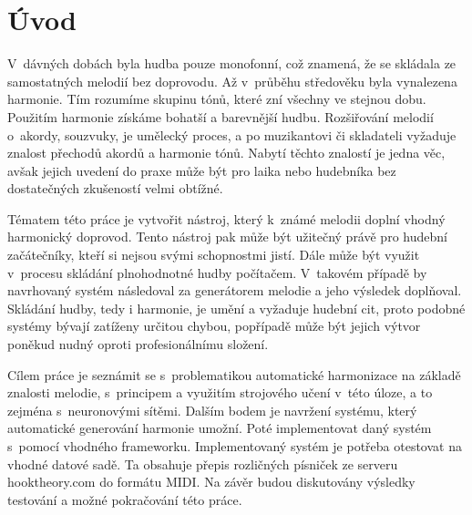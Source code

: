 \chapter{Úvod}
\label{uvod}

V~dávných dobách byla hudba pouze monofonní, což znamená, 
že se skládala ze samostatných melodií bez doprovodu.
Až v~průběhu středověku byla vynalezena harmonie.
Tím rozumíme skupinu tónů, které zní všechny ve stejnou dobu.
Použitím harmonie získáme bohatší a barevnější hudbu.
Rozšiřování melodií o~akordy, souzvuky, je umělecký proces,
a po muzikantovi či skladateli vyžaduje znalost přechodů akordů a harmonie tónů.
Nabytí těchto znalostí je jedna věc, 
avšak jejich uvedení do praxe může být pro laika 
nebo hudebníka bez dostatečných zkušeností velmi obtížné.
\par

Tématem této práce je vytvořit nástroj, 
který k~známé melodii doplní vhodný harmonický doprovod.
Tento nástroj pak může být užitečný právě pro hudební začátečníky,
kteří si nejsou svými schopnostmi jistí. 
Dále může být využit v~procesu skládání plnohodnotné hudby počítačem.
V~takovém případě by navrhovaný systém následoval za generátorem melodie
a jeho výsledek doplňoval.
Skládání hudby, tedy i harmonie, je umění a vyžaduje hudební cit,
proto podobné systémy bývají zatíženy určitou chybou, 
popřípadě může být jejich výtvor poněkud nudný oproti profesionálnímu složení.
\par

Cílem práce je seznámit se s~problematikou automatické harmonizace na základě znalosti melodie,
s~principem a využitím strojového učení v~této úloze, a to zejména s~neuronovými sítěmi.
Dalším bodem je navržení systému, který automatické generování harmonie umožní.
Poté implementovat daný systém s~pomocí vhodného frameworku.
Implementovaný systém je potřeba otestovat na vhodné datové sadě. 
Ta obsahuje přepis rozličných písniček ze serveru hooktheory.com
do formátu MIDI.
Na závěr budou diskutovány výsledky testování a možné pokračování této práce.

